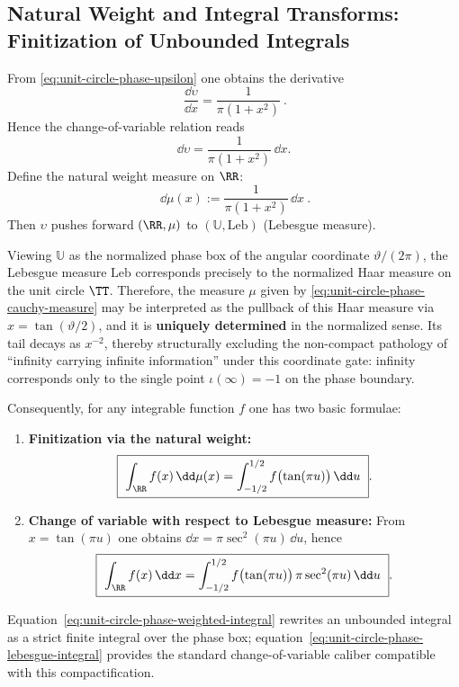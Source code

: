 \subsection{Natural Weight and Integral Transforms: Finitization of Unbounded Integrals}\label{subsec:unit-circle-phase-integrals}
From \eqref{eq:unit-circle-phase-upsilon} one obtains the derivative
\begin{equation}\label{eq:unit-circle-phase-derivative}
\boxed{\ \frac{\dd \upsilon}{\dd x}=\frac{1}{\pi(1+x^2)}\ }.
\end{equation}
Hence the change-of-variable relation reads
\[
\dd \upsilon=\frac{1}{\pi(1+x^2)}\,\dd x.
\]
Define the natural weight measure on \(\RR\):
\begin{equation}\label{eq:unit-circle-phase-cauchy-measure}
\boxed{\ \dd\mu(x):=\frac{1}{\pi(1+x^2)}\,\dd x\ }.
\end{equation}
Then \(\upsilon\) pushes forward \((\RR,\mu)\) to \((\mathbb{U},\mathrm{Leb})\) (Lebesgue measure).
\begin{remark}\label{rem:unit-circle-phase-haar-pullback-weight}
Viewing \(\mathbb{U}\) as the normalized phase box of the angular coordinate \(\vartheta/(2\pi)\), the Lebesgue measure \(\mathrm{Leb}\) corresponds precisely to the normalized Haar measure on the unit circle \(\TT\).
Therefore, the measure \(\mu\) given by \eqref{eq:unit-circle-phase-cauchy-measure} may be interpreted as the pullback of this Haar measure via \(x=\tan(\vartheta/2)\), and it is \textbf{uniquely determined} in the normalized sense.
Its tail decays as \(x^{-2}\), thereby structurally excluding the non-compact pathology of ``infinity carrying infinite information'' under this coordinate gate: infinity corresponds only to the single point \(\iota(\infty)=-1\) on the phase boundary.
\end{remark}
Consequently, for any integrable function \(f\) one has two basic formulae:
\begin{enumerate}
  \item \textbf{Finitization via the natural weight:}
  \begin{equation}\label{eq:unit-circle-phase-weighted-integral}
  \boxed{\ \int_{\RR} f(x)\,\dd\mu(x)=\int_{-1/2}^{1/2} f\bigl(\tan(\pi u)\bigr)\,\dd u\ }.
  \end{equation}
  \item \textbf{Change of variable with respect to Lebesgue measure:} From \(x=\tan(\pi u)\) one obtains \(\dd x=\pi\sec^2(\pi u)\,\dd u\), hence
  \begin{equation}\label{eq:unit-circle-phase-lebesgue-integral}
  \boxed{\ \int_{\RR} f(x)\,\dd x=\int_{-1/2}^{1/2} f\bigl(\tan(\pi u)\bigr)\,\pi\sec^2(\pi u)\,\dd u\ }.
  \end{equation}
\end{enumerate}
Equation~\eqref{eq:unit-circle-phase-weighted-integral} rewrites an unbounded integral as a strict finite integral over the phase box; equation~\eqref{eq:unit-circle-phase-lebesgue-integral} provides the standard change-of-variable caliber compatible with this compactification.
